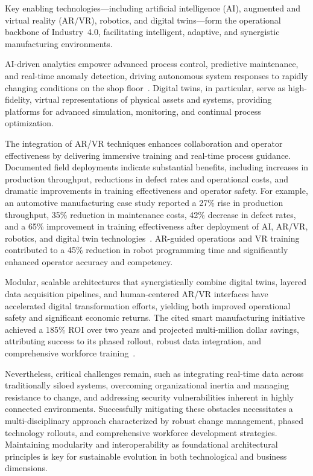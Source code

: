 \documentclass[sigconf]{acmart}
\begin{document}
Key enabling technologies—including artificial intelligence (AI), augmented and virtual reality (AR/VR), robotics, and digital twins—form the operational backbone of Industry~4.0, facilitating intelligent, adaptive, and synergistic manufacturing environments.

AI-driven analytics empower advanced process control, predictive maintenance, and real-time anomaly detection, driving autonomous system responses to rapidly changing conditions on the shop floor~\cite{ref23}. Digital twins, in particular, serve as high-fidelity, virtual representations of physical assets and systems, providing platforms for advanced simulation, monitoring, and continual process optimization.

The integration of AR/VR techniques enhances collaboration and operator effectiveness by delivering immersive training and real-time process guidance. Documented field deployments indicate substantial benefits, including increases in production throughput, reductions in defect rates and operational costs, and dramatic improvements in training effectiveness and operator safety. For example, an automotive manufacturing case study reported a 27\% rise in production throughput, 35\% reduction in maintenance costs, 42\% decrease in defect rates, and a 65\% improvement in training effectiveness after deployment of AI, AR/VR, robotics, and digital twin technologies~\cite{ref23}. AR-guided operations and VR training contributed to a 45\% reduction in robot programming time and significantly enhanced operator accuracy and competency.

Modular, scalable architectures that synergistically combine digital twins, layered data acquisition pipelines, and human-centered AR/VR interfaces have accelerated digital transformation efforts, yielding both improved operational safety and significant economic returns. The cited smart manufacturing initiative achieved a 185\% ROI over two years and projected multi-million dollar savings, attributing success to its phased rollout, robust data integration, and comprehensive workforce training~\cite{ref23}.

Nevertheless, critical challenges remain, such as integrating real-time data across traditionally siloed systems, overcoming organizational inertia and managing resistance to change, and addressing security vulnerabilities inherent in highly connected environments. Successfully mitigating these obstacles necessitates a multi-disciplinary approach characterized by robust change management, phased technology rollouts, and comprehensive workforce development strategies. Maintaining modularity and interoperability as foundational architectural principles is key for sustainable evolution in both technological and business dimensions.
\end{document}
